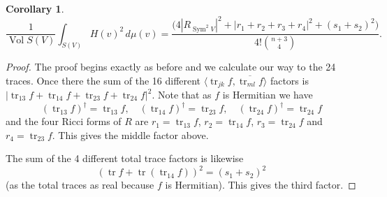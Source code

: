 \documentclass[10pt,a4paper]{amsart}
\newtheorem{coro}[theo]{Corollary}
\theoremstyle{definition}
\def\ov#1{\overline{#1}}
\def\d{\,d}
\DeclareMathOperator{\Sym}{Sym}
\DeclareMathOperator{\tr}{tr}
\DeclareMathOperator{\Vol}{Vol}
\begin{document}
\begin{coro}
$$
\frac{1}{\Vol S(V)} \int_{S(V)}
\!\!\!
H(v)^2  \d\mu(v)
= \frac{
\bigl(
4 |R_{\Sym^2 V}|^2
+ |r_1 + r_2 + r_3 + r_4|^2
+ (s_1 + s_2)^2
\bigr)
}{4! \binom{n+3}{4}}.
$$
\end{coro}

\begin{proof}
The proof begins exactly as before and we calculate our way to the 24 traces.
Once there
the sum of the 16 different $\langle \tr_{jk} f, \ov{\tr_{ml} f} \rangle$
factors is $|\!\tr_{13} f + \tr_{14} f + \tr_{23} f + \tr_{24} f|^2$.
Note that as $f$ is Hermitian we have
$$
(\tr_{13} f)^\dagger = \tr_{13} f,
\quad
(\tr_{14} f)^\dagger = \tr_{23} f,
\quad
(\tr_{24} f)^\dagger = \tr_{24} f
$$
and the four Ricci forms of $R$ are $r_1 = \tr_{13} f$, $r_2 = \tr_{14} f$,
$r_3 = \tr_{24} f$ and $r_4 = \tr_{23} f$.
This gives the middle factor above.

The sum of the 4 different total trace factors is likewise
$$
(\tr f + \tr(\tr_{14} f))^2 = (s_1 + s_2)^2
$$
(as the total traces as real because $f$ is Hermitian).
This gives the third factor.


\end{proof}
\end{document}
